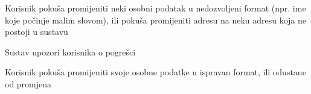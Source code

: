 \begin{packed_item}
\begin{packed_item}
\begin{packed_enum}
							\end{packed_enum}
							
							\item[2.c] Korisnik pokuša promijeniti neki osobni podatak u nedozvoljeni format (npr. ime koje počinje malim slovom), ili pokuša promijeniti adresu na neku adresu koja ne postoji u sustavu
							\item[] \begin{packed_enum}
								
								\item Sustav upozori korisnika o pogrešci
								\item Korisnik pokuša promijeniti svoje osobne podatke u ispravan format, ili odustane od promjena
								
							\end{packed_enum}
							
						\end{packed_item}
					\end{packed_item}
					

